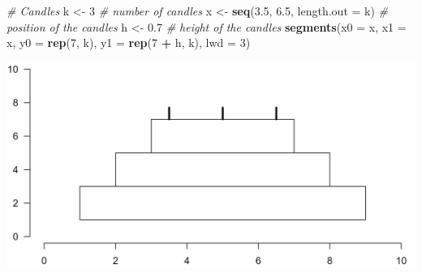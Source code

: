 \documentclass[
]{book}
\newenvironment{Shaded}{\begin{snugshade}}{\end{snugshade}}
\newcommand{\AttributeTok}[1]{\textcolor[rgb]{0.13,0.29,0.53}{#1}}
\newcommand{\CommentTok}[1]{\textcolor[rgb]{0.56,0.35,0.01}{\textit{#1}}}
\newcommand{\DecValTok}[1]{\textcolor[rgb]{0.00,0.00,0.81}{#1}}
\newcommand{\FloatTok}[1]{\textcolor[rgb]{0.00,0.00,0.81}{#1}}
\newcommand{\FunctionTok}[1]{\textcolor[rgb]{0.13,0.29,0.53}{\textbf{#1}}}
\newcommand{\NormalTok}[1]{#1}
\newcommand{\OtherTok}[1]{\textcolor[rgb]{0.56,0.35,0.01}{#1}}
\newcommand{\SpecialCharTok}[1]{\textcolor[rgb]{0.81,0.36,0.00}{\textbf{#1}}}
\begin{document}
\begin{Shaded}
\begin{Highlighting}[]
\CommentTok{\# Candles}
\NormalTok{k }\OtherTok{\textless{}{-}} \DecValTok{3}                             \CommentTok{\# number of candles}
\NormalTok{x }\OtherTok{\textless{}{-}} \FunctionTok{seq}\NormalTok{(}\FloatTok{3.5}\NormalTok{, }\FloatTok{6.5}\NormalTok{, }\AttributeTok{length.out =}\NormalTok{ k) }\CommentTok{\# position of the candles}
\NormalTok{h }\OtherTok{\textless{}{-}} \FloatTok{0.7}                           \CommentTok{\# height of the candles}
\FunctionTok{segments}\NormalTok{(}\AttributeTok{x0 =}\NormalTok{ x, }\AttributeTok{x1 =}\NormalTok{ x, }\AttributeTok{y0 =} \FunctionTok{rep}\NormalTok{(}\DecValTok{7}\NormalTok{, k), }\AttributeTok{y1 =} \FunctionTok{rep}\NormalTok{(}\DecValTok{7} \SpecialCharTok{+}\NormalTok{ h, k), }\AttributeTok{lwd =} \DecValTok{3}\NormalTok{)}
\end{Highlighting}
\end{Shaded}

\includegraphics[width=28in]{figures/cake}
\end{document}
